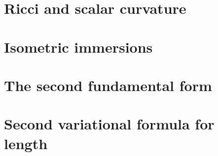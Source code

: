 \documentclass[letter-paper]{tufte-book}
\begin{document}

\section{Ricci and scalar curvature}


\section{Isometric immersions}


\section{The second fundamental form}


\section{Second variational formula for length}










\mainmatter




%


\end{document}
